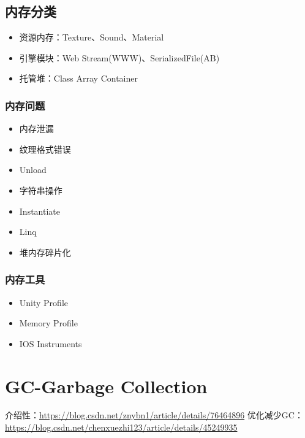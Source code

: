 \documentclass[UTF8,a4paper,12pt]{ctexbook}
\begin{document}
	\section{内存分类}
		\begin{itemize}
			\item 资源内存：Texture、Sound、Material
			\item 引擎模块：Web Stream(WWW)、SerializedFile(AB)
			\item 托管堆：Class Array Container
		\end{itemize}
		
		\subsection{内存问题}
			\begin{itemize}
				\item 内存泄漏
				\item 纹理格式错误
				\item Unload
				\item 字符串操作
				\item Instantiate
				\item Linq
				\item 堆内存碎片化
			\end{itemize}
		
		\subsection{内存工具}
			\begin{itemize}
				\item Unity Profile
				\item Memory Profile
				\item IOS Instruments
			\end{itemize}	
			
		
\chapter{GC-Garbage Collection}
	介绍性：\url{https://blog.csdn.net/znybn1/article/details/76464896}
	优化减少GC：\url{https://blog.csdn.net/chenxuezhi123/article/details/45249935}
	\section{}
	
	\section{}
	
\end{document}
